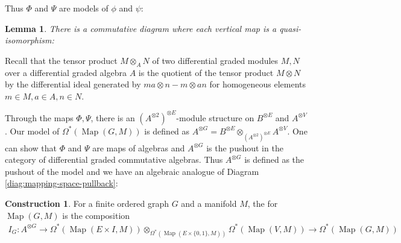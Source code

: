 \documentclass{scrartcl}
\let\emph\relax
\theoremstyle{plain}
\newtheorem{lemma}[theorem]{Lemma}
\theoremstyle{definition}
\newtheorem{construction}[theorem]{Construction}
\DeclareMathOperator{\Map}{Map}
\begin{document}
Thus $\Phi$ and $\Psi$ are models of $\phi$ and $\psi$:
\begin{lemma}\label{lem:graph-model-aid}
    There is a commutative diagram where each vertical map is a quasi-isomorphism:
    \begin{center}
    \end{center}
\end{lemma}

Recall that the tensor product $M\otimes_A N$ of two differential graded modules $M, N$ over a differential graded algebra $A$ is the quotient of the tensor product $M\otimes N$ by the differential ideal generated by $ma \otimes n - m\otimes an$ for homogeneous elements $m\in M, a\in A, n\in N$. 

Through the maps $\Phi, \Psi$, there is an $(A^{\otimes 2})^{\otimes E}$-module structure on $B^{\otimes E}$ and $A^{\otimes V}$. Our model of $\Omega^*(\Map(G, M))$ is defined as $A^{\otimes G} = B^{\otimes E}\otimes_{(A^{\otimes 2})^{\otimes E}} A^{\otimes V}$. One can show that $\Phi$ and $\Psi$ are maps of algebras and $A^{\otimes G}$ is the pushout in the category of differential graded commutative algebras. Thus $A^{\otimes G}$ is defined as the pushout of the model and we have an algebraic analogue of Diagram \ref{diag:mapping-space-pullback}:

\begin{center}\label{diag:mapping-space-pullback-algebraic}
\end{center}


\begin{construction}
    For a finite ordered graph $G$ and a manifold $M$, the \emph{iterated integral map} for $\Map(G, M)$ is the composition
    \begin{align*}
        I_G\colon A^ {\otimes G}\to\Omega^*(\Map(E\times I, M))\otimes_{\Omega^*(\Map(E\times\{0,1\}, M))} \Omega^*(\Map(V, M)) \to \Omega^*(\Map(G, M))
    \end{align*}
\end{construction}
\end{document}
